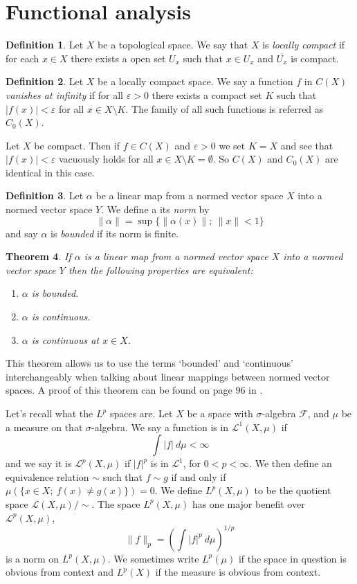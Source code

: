 \documentclass[a4paper,12pt,twoside,BCOR=10mm]{scrbook}
\newtheorem{theorem}{Theorem}[section]
\theoremstyle{definition}
\theoremstyle{definition}
\theoremstyle{definition}
\newtheorem{definition}[theorem]{Definition}
\begin{document}
\section{Functional analysis}
\begin{definition}
Let $X$ be a topological space.
We say that $X$ is \emph{locally compact} if for each $x \in X$ there exists a open set $U_x$ such that $x \in U_x$ and $\overline{U_x}$ is compact.
\end{definition}
\begin{definition}
\label{locallycompactdef}
Let $X$ be a locally compact space.
We say a function $f$ in $C(X)$ \emph{vanishes at infinity} if for all $\varepsilon > 0$ there exists a compact set $K$ such that $|f(x)| < \varepsilon$ for all $x \in X \setminus K$.
The family of all such functions is referred as $C_0(X)$.
\end{definition}
Let $X$ be compact.
Then if $f \in C(X)$ and $\varepsilon > 0$ we set $K = X$ and see that $|f(x)| < \varepsilon$ vacuously holds for all $x \in X \setminus K = \emptyset$.
So $C(X)$ and $C_0(X)$ are identical in this case.
\begin{definition}
Let $\alpha$ be a linear map from a normed vector space $X$ into a normed vector space $Y$.
We define a its \emph{norm} by
\[
	\|\alpha\| = \sup\{\|\alpha(x)\|;\ \|x\| < 1\}
\]
and say $\alpha$ is \emph{bounded} if its norm is finite.
\end{definition}
\begin{theorem}
If $\alpha$ is a linear map from a normed vector space $X$ into a normed vector space $Y$ then the following properties are equivalent:
\begin{enumerate}
\item[\emph{(i)}] $\alpha$ is bounded.
\item[\emph{(ii)}] $\alpha$ is continuous.
\item[\emph{(iii)}] $\alpha$ is continuous at $x \in X$.
\end{enumerate}
\end{theorem}
This theorem allows us to use the terms `bounded' and `continuous' interchangeably when talking about linear mappings between normed vector spaces.
A proof of this theorem can be found on page $96$ in \citep{rudin2}.

Let's recall what the $L^p$ spaces are.
Let $X$ be a space with $\sigma$-algebra $\mathcal{F}$, and $\mu$ be a measure on that $\sigma$-algebra.
We say a function is in $\mathcal{L}^1(X, \mu)$ if
\[
	\int |f|\ d\mu < \infty
\]
and we say it is $\mathcal{L}^p(X, \mu)$ if $|f|^p$ is in $\mathcal{L}^1$, for $0 < p < \infty$.
We then define an equivalence relation $\sim$ such that $f \sim g$ if and only if $\mu(\{x \in X;\ f(x) \neq g(x)\}) = 0$.
We define $L^p(X, \mu)$ to be the quotient space $\mathcal{L}(X, \mu)/\sim$.
The space $L^p(X, \mu)$ has one major benefit over $\mathcal{L}^p(X, \mu)$,
\[
	\|f\|_p = 
	\left ( \int |f|^p\ d\mu \right )^{1/p}
\]
is a norm on $L^p(X, \mu)$.
We sometimes write $L^p(\mu)$ if the space in question is obvious from context and $L^p(X)$ if the measure is obvious from context.
\end{document}
